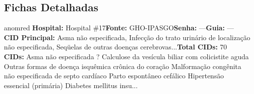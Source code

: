 \documentclass[a4paper,10pt]{article}
\begin{document}
\subsection{Fichas Detalhadas}
\begin{anomalycard}[Interna\c{c}\~{a}o \#214 | Pac. \#265 | CR\'{I}TICO (z=6.19) | LOS: 12d | 11/03/2026\,$\to$\,—]{anomred}
\textbf{Hospital:} Hospital \#17\quad \textbf{Fonte:} GHO-IPASGO\quad \textbf{Senha:} ---\quad \textbf{Guia:} ---\\

\textbf{CID Principal:} {\small Asma não especificada, Infecção do trato urinário de localização não especificada, Seqüelas de outras doenças cerebrovas...}\quad\textbf{Total CIDs:} 70\\

\textbf{CIDs:} {\scriptsize Asma não especificada \textbar{} ? \textbar{} Calculose da vesícula biliar com colicistite aguda \textbar{} Outras formas de doença isquêmica crônica do coração \textbar{} Malformação congênita não especificada de septo cardíaco \textbar{} Parto espontâneo cefálico \textbar{} Hipertensão essencial (primária) \textbar{} Diabetes mellitus insu...}\\

\end{anomalycard}
\end{document}
